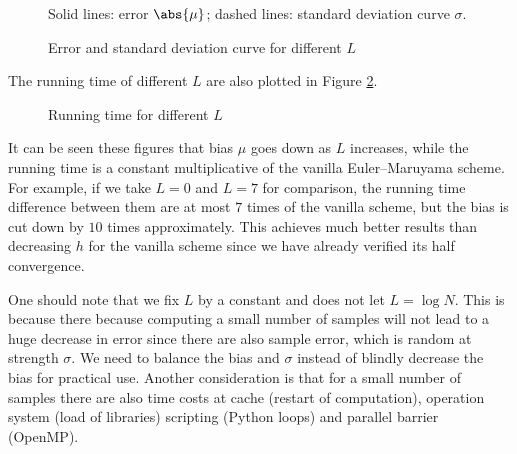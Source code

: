 \documentclass[english, nochinese]{pnote}
\begin{document}
\begin{figure}[htbp]
{
\centering

\caption{Error and standard deviation curve for different $L$}
\label{Fig:Summ}
}
{
\footnotesize Solid lines: error $\abs{\mu}$; dashed lines: standard deviation curve $\sigma$.
}
\end{figure}

The running time of different $L$ are also plotted in Figure \ref{Fig:SummTime}.

\begin{figure}[htbp]
\centering

\caption{Running time for different $L$}
\label{Fig:SummTime}
\end{figure}

It can be seen these figures that bias $\mu$ goes down as $L$ increases, while the running time is a constant multiplicative of the vanilla Euler--Maruyama scheme. For example, if we take $ L = 0 $ and $ L = 7 $ for comparison, the running time difference between them are at most $7$ times of the vanilla scheme, but the bias is cut down by $10$ times approximately. This achieves much better results than decreasing $h$ for the vanilla scheme since we have already verified its half convergence.

One should note that we fix $L$ by a constant and does not let $ L = \log N $. This is because there because computing a small number of samples will not lead to a huge decrease in error since there are also sample error, which is random at strength $\sigma$. We need to balance the bias and $\sigma$ instead of blindly decrease the bias for practical use. Another consideration is that for a small number of samples there are also time costs at cache (restart of computation), operation system (load of libraries) scripting (Python loops) and parallel barrier (OpenMP).
\end{document}
